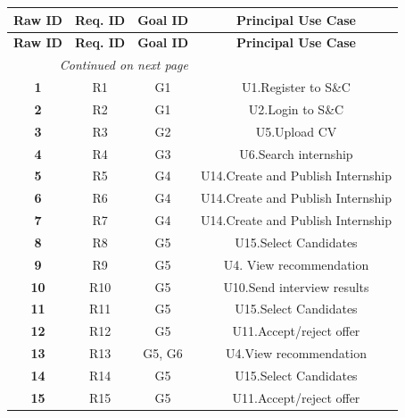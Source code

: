 \begin{longtable}{|c|c|c|c|}
    \hline
    \textbf{Raw ID} & \textbf{Req. ID} & \textbf{Goal ID} & \textbf{Principal Use Case} \T\B \\
    \hline \hline
    \endfirsthead%
    
    \hline
    \textbf{Raw ID} & \textbf{Req. ID} & \textbf{Goal ID} & \textbf{Principal Use Case} \T\B \\
    \hline \hline
    \endhead%
    
    \hline
    \multicolumn{3}{r}{\textit{Continued on next page}} \\
    \endfoot%
    
    \hline
    \endlastfoot%
        \hline \hline
        \textbf{1} & R1 & G1 & U1.Register to S\&C   \T\B \\
        \hline
        \textbf{2} & R2 & G1 & U2.Login to S\&C  \T\B \\
        \hline
        \textbf{3} & R3 & G2 & U5.Upload CV  \T\B \\
        \hline
        \textbf{4} & R4 & G3 & U6.Search internship  \T\B \\
        \hline
        \textbf{5} & R5 & G4 & U14.Create and Publish Internship  \T\B \\
        \hline
        \textbf{6} & R6 & G4 & U14.Create and Publish Internship  \T\B \\
        \hline
        \textbf{7} & R7 & G4 & U14.Create and Publish Internship  \T\B \\
        \hline
        \textbf{8} & R8 & G5 & U15.Select Candidates  \T\B \\
        \hline
        \textbf{9} & R9 & G5 & U4. View recommendation  \T\B \\
        \hline
        \textbf{10} & R10 & G5 & U10.Send interview results  \T\B \\
        \hline
        \textbf{11} & R11 & G5 & U15.Select Candidates  \T\B \\
        \hline
        \textbf{12} & R12 & G5 & U11.Accept/reject offer  \T\B \\
        \hline
        \textbf{13} & R13 & G5, G6 & U4.View recommendation  \T\B \\
        \hline
        \textbf{14} & R14 & G5 & U15.Select Candidates  \T\B \\
        \hline
        \textbf{15} & R15 & G5 & U11.Accept/reject offer  \T\B \\

\end{longtable}
